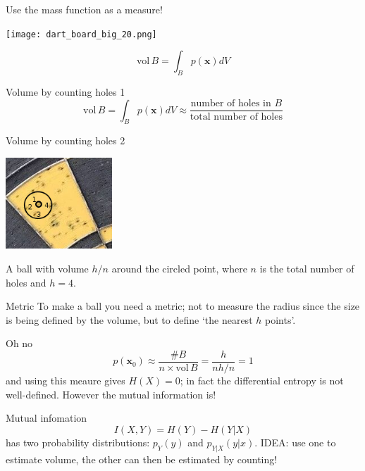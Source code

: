 \documentclass{beamer}
\begin{document}
\begin{frame}{Use the mass function as a measure!}
\color{reddish}
\begin{center}
\texttt{[image: dart\_board\_big\_20.png]}
\end{center}
\color{dark}
$$\mbox{vol}\,B=\int_B p(\mathbf{x}) dV$$
\color{black}
\end{frame}



\begin{frame}{Volume by counting holes 1}
\color{dark}
$$\mbox{vol}\,B=\int_B p(\mathbf{x}) dV\approx \frac{\mbox{number of holes in }B}{\mbox{total number of holes}}$$
\end{frame}

\begin{frame}{Volume by counting holes 2}
\color{reddish}
\begin{center}
\includegraphics[width=4cm]{dart_board_zoom_ball.png}
\end{center}
\color{black}
A ball with volume $h/n$ around the circled point, where $n$ is the total number of holes and $h=4$.
\end{frame}


\begin{frame}{Metric}
To make a ball you need a metric; not to measure the radius since the
size is being defined by the volume, but to define \lq{}the nearest
$h$ points\rq{}.
\color{reddish}
\begin{center}
\color{reddish}

\end{center}
\end{frame}


\begin{frame}{Oh no}
\color{dark}
$$p(\mathbf{x}_0)\approx\frac{\#B}{n\times \mbox{vol}\,B}=\frac{h}{nh/n}=1$$
\color{black}
and using this meaure gives $H(X)=0$; in fact the
  differential entropy is not well-defined. However the
  mutual information is!
\end{frame}


\begin{frame}{Mutual infomation}
\color{dark}
$$I(X,Y)=H(Y)-H(Y|X)$$ 
\color{black}
has two probability distributions: $p_Y(y)$ and
  $p_{Y|X}(y|x)$.
\vskip 1cm
IDEA: use one to estimate volume, the other can then
  be estimated by counting!
\end{frame}
\end{document}
